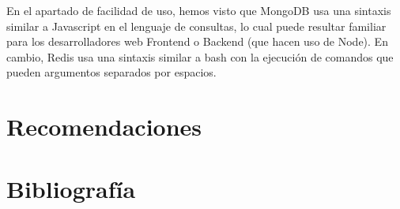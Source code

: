 \documentclass[twocolumn]{article}
\begin{document}
En el apartado de facilidad de uso, hemos visto que MongoDB usa una sintaxis similar a Javascript en el lenguaje de consultas, lo cual puede resultar familiar para los desarrolladores web Frontend o Backend (que hacen uso de Node). En cambio, Redis usa una sintaxis similar a bash con la ejecución de comandos que pueden argumentos separados por espacios.

\section{Recomendaciones}



\section{Bibliografía}
\end{document}
